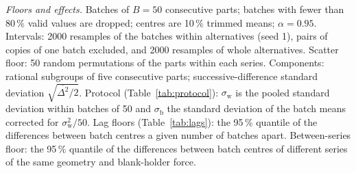 \documentclass[pdflatex,sn-basic]{sn-jnl}
\begin{document}
\emph{Floors and effects.} Batches of $B=50$ consecutive parts; batches with fewer than 80\,\% valid values are dropped; centres are 10\,\% trimmed means; $\alpha=0.95$. Intervals: 2000 resamples of the batches within alternatives (seed 1), pairs of copies of one batch excluded, and 2000 resamples of whole alternatives. Scatter floor: 50 random permutations of the parts within each series. Components: rational subgroups of five consecutive parts; successive-difference standard deviation $\sqrt{\overline{\Delta^2}/2}$. Protocol (Table~\ref{tab:protocol}): $\sigma_\mathrm{w}$ is the pooled standard deviation within batches of 50 and $\sigma_\mathrm{b}$ the standard deviation of the batch means corrected for $\sigma_\mathrm{w}^2/50$. Lag floors (Table~\ref{tab:lags}): the 95\,\% quantile of the differences between batch centres a given number of batches apart. Between-series floor: the 95\,\% quantile of the differences between batch centres of different series of the same geometry and blank-holder force.
\end{document}
